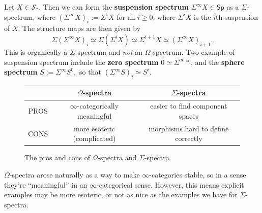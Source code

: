 \begin{example}
    Let $X \in \mathcal{S} _*$. Then we can form the \textbf{suspension spectrum} $\Sigma ^{\infty}X \in \mathsf{Sp} $ as a $\Sigma$-spectrum, where $\left( \Sigma ^{\infty}X \right) _i :=\Sigma^i  X$ for all $i\geq 0$, where $\Sigma^i X$ is the $i$th suspension of $X$. The structure maps are then given by \[
        \Sigma\left(\Sigma ^{\infty}X\right)_i \simeq \Sigma \left( \Sigma^i X \right) \simeq \Sigma ^{i+1}X\simeq \left( \Sigma ^{\infty}X \right) _{i+1}.
    \] This is organically a $\Sigma$-spectrum and \emph{not} an $\Omega$-spectrum. Two example of suspension spectrum include the \textbf{zero spectrum} $0\simeq \Sigma ^{\infty}*$, and the \textbf{sphere spectrum} $S:=\Sigma ^{\infty}S^0,$ so that $\left( \Sigma ^{\infty}S\right) _i   \simeq S^i.$
\end{example}
\begin{figure}[h]
    \centering
\begin{tabular}{|| c || c | c || } 
   \hline& $\Omega$-spectra & $\Sigma $-spectra \\ \hline\hline
    PROS & $\infty$-categorically meaningful & easier to find component spaces\\ \hline
    CONS & more esoteric (complicated) & morphisms hard to define correctly \\ \hline
\end{tabular}
\label{procon} 
\caption{The pros and cons of $\Omega$-spectra and $\Sigma$-spectra.} 
\end{figure}
$\Omega$-spectra arose naturally as a way to make $\infty$-categories stable, so in a sense they're ``meaningful'' in an $\infty$-categorical sense. However, this means explicit examples may be more esoteric, or not as nice as the examples we have for $\Sigma$-spectra. 

